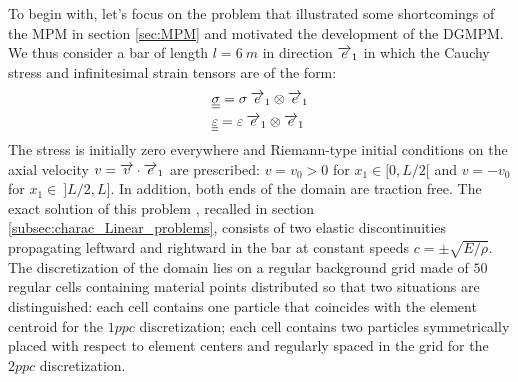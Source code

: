 To begin with, let's focus on the problem that illustrated some shortcomings of the MPM in section \ref{sec:MPM} and motivated the development of the DGMPM.
We thus consider a bar of length $l=6\:m$ in direction ${\overrightarrow{e}}_1$ in which the Cauchy stress and infinitesimal strain tensors are of the form:
\begin{align*}
  & {\underline{\underline{\sigma}}} = \sigma \: {\overrightarrow{e}}_1\otimes {\overrightarrow{e}}_1 \\
  & {\underline{\underline{\varepsilon}}} = \varepsilon \: {\overrightarrow{e}}_1\otimes {\overrightarrow{e}}_1
\end{align*}
The stress is initially zero everywhere and Riemann-type initial conditions on the axial velocity $v={\overrightarrow{v}}\cdot{\overrightarrow{e}}_1$ are prescribed: $v=v_0>0$ for $x_1\in [0,L/2[$ and $v=-v_0$ for $x_1\in \:]L/2,L]$. In addition, both ends of the domain are traction free.
The exact solution of this problem \cite[Ch.1]{Wang}, recalled in section \ref{subsec:charac_Linear_problems}, consists of two elastic discontinuities propagating leftward and rightward in the bar at constant speeds $c=\pm\sqrt{E/\rho}$. 
The discretization of the domain lies on a regular background grid made of $50$ regular cells containing material points distributed so that two situations are distinguished: each cell contains one particle that coincides with the element centroid for the $1ppc$ discretization; each cell contains two particles symmetrically placed with respect to element centers and regularly spaced in the grid for the $2ppc$ discretization.

